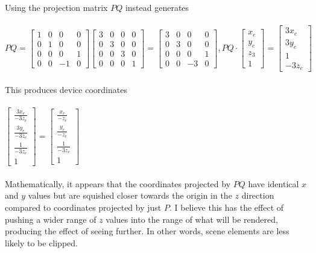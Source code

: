 \documentclass[letterpaper, 11pt]{article}
\begin{document}
Using the projection matrix $PQ$ instead generates \\ \\ 
$PQ = \begin{bmatrix}
1 & 0 & 0 & 0 \\
0 & 1 & 0 & 0 \\
0 & 0 & 0 & 1 \\
0 & 0 & -1 & 0
\end{bmatrix} 
\begin{bmatrix}
3 & 0 & 0 & 0 \\
0 & 3 & 0 & 0 \\
0 & 0 & 3 & 0 \\
0 & 0 & 0 & 1
\end{bmatrix}
=
\begin{bmatrix}
3 & 0 & 0 & 0 \\
0 & 3 & 0 & 0 \\
0 & 0 & 0 & 1 \\
0 & 0 & -3 & 0
\end{bmatrix},
PQ \cdot 
\begin{bmatrix}
x_e  \\
y_e  \\
z_3  \\
1 
\end{bmatrix}
=
\begin{bmatrix}
3x_e  \\
3y_e  \\
1  \\
-3z_e 
\end{bmatrix}$ \\ \\ 


This produces device coordinates \\ \\ 
$\begin{bmatrix}
\frac{3x_e}{-3z_e}  \\
\frac{3y_e}{-3z_e}  \\
\frac{1}{-3z_e} \\
1
\end{bmatrix}
=
\begin{bmatrix}
\frac{x_e}{-z_e}  \\
\frac{y_e}{-z_e}  \\
\frac{1}{-3z_e} \\
1
\end{bmatrix}$ \\ \\ 

Mathematically, it appears that the coordinates projected by $PQ$ have identical $x$ and $y$ values but are squished closer towards the origin in the $z$ direction compared to coordinates projected by just $P$. I believe this has the effect of pushing a wider range of $z$ values into the range of what will be rendered, producing the effect of seeing further. In other words, scene elements are less likely to be clipped.
\end{document}
